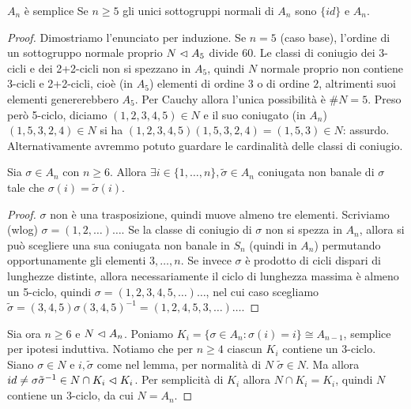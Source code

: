 \begin{proposition}{$A_n$ è semplice}
    Se $n \ge 5$ gli unici sottogruppi normali di $A_n$ sono $\{id\}$ e $A_n$.
\end{proposition}
\begin{proof}
    Dimostriamo l'enunciato per induzione. Se $n = 5$ (caso base), l'ordine di un sottogruppo normale proprio $N \vartriangleleft A_5$ divide $60$. Le classi di coniugio dei 3-cicli e dei 2+2-cicli non si spezzano in $A_5$, quindi $N$ normale proprio non contiene 3-cicli e 2+2-cicli, cioè (in $A_5$) elementi di ordine $3$ o di ordine $2$, altrimenti suoi elementi genererebbero $A_5$. Per Cauchy allora l'unica possibilità è $\#N = 5$. Preso però 5-ciclo, diciamo $(1, 2, 3, 4, 5) \in N$ e il suo coniugato (in $A_n$) $(1, 5, 3, 2, 4) \in N$ si ha $(1, 2, 3, 4, 5)(1, 5, 3, 2, 4) = (1, 5, 3) \in N$: assurdo. Alternativamente avremmo potuto guardare le cardinalità delle classi di coniugio.

    \begin{lemma2}
        Sia $\sigma \in A_n$ con $n \ge 6$. Allora $\exists i \in \{1, \dots, n\}, \tilde \sigma \in A_n$ coniugata non banale di $\sigma$ tale che $\sigma(i) = \tilde \sigma(i)$.
    \end{lemma2}
    \begin{proof}
        $\sigma$ non è una trasposizione, quindi muove almeno tre elementi. Scriviamo (wlog) $\sigma = (1, 2, \dots)\dots$. Se la classe di coniugio di $\sigma$ non si spezza in $A_n$, allora si può scegliere una sua coniugata non banale in $S_n$ (quindi in $A_n$) permutando opportunamente gli elementi $3, \dots, n$. Se invece $\sigma$ è prodotto di cicli dispari di lunghezze distinte, allora necessariamente il ciclo di lunghezza massima è almeno un 5-ciclo, quindi $\sigma = (1, 2, 3, 4, 5, \dots)\dots$, nel cui caso scegliamo $\tilde \sigma = (3, 4, 5) \sigma (3, 4, 5)^{-1} = (1, 2, 4, 5, 3, \dots)\dots$.
    \end{proof}
    Sia ora $n \ge 6$ e $N \vartriangleleft A_n$. Poniamo $K_i = \{\sigma \in A_n : \sigma(i) = i\} \cong A_{n - 1}$, semplice per ipotesi induttiva. Notiamo che per $n \ge 4$ ciascun $K_i$ contiene un 3-ciclo. Siano $\sigma \in N$ e $i, \tilde \sigma$ come nel lemma, per normalità di $N$ $\tilde \sigma \in N$. Ma allora $id \neq \sigma {\tilde \sigma}^{-1} \in N \cap K_i \vartriangleleft K_i$. Per semplicità di $K_i$ allora $N \cap K_i = K_i$, quindi $N$ contiene un 3-ciclo, da cui $N = A_n$.
\end{proof}
    
